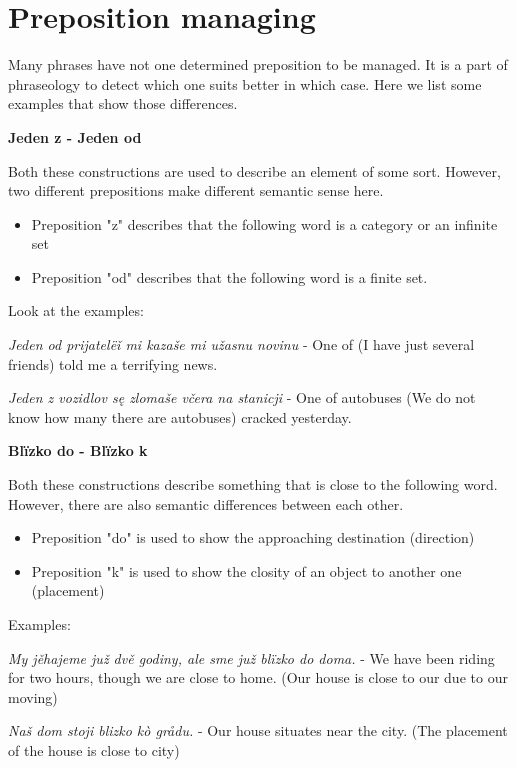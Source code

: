 \section{Preposition managing}

Many phrases have not one determined preposition to be managed. It is a part of phraseology to detect which one suits better in which case. Here we list some examples that show those differences.

\textbf{Jeden z - Jeden od}

Both these constructions are used to describe an element of some sort. However, two different prepositions make different semantic sense here.

\begin{itemize}
	\item Preposition "z" describes that the following word is a category or an infinite set
	\item Preposition "od" describes that the following word is a finite set.
\end{itemize}

Look at the examples:

\textit{Jeden od prijatelëǐ mi kazaše mi užasnu novinu} - One of (I have just several friends) told me a terrifying news.

\textit{Jeden z vozidlov sę zlomaše včera na stanicji} - One of autobuses (We do not know how many there are autobuses) cracked yesterday.

\textbf{Blïzko do - Blïzko k}

Both these constructions describe something that is close to the following word. However, there are also semantic differences between each other.

\begin{itemize}
	\item Preposition "do" is used to show the approaching destination (direction)
	\item Preposition "k" is used to show the closity of an object to another one (placement)
\end{itemize}

Examples:

\textit{My jěhajeme juž dvě godiny, ale sme juž blïzko do doma.} - We have been riding for two hours, though we are close to home. (Our house is close to our due to our moving)

\textit{Naš dom stoji blizko kò grådu.} - Our house situates near the city. (The placement of the house is close to city)

